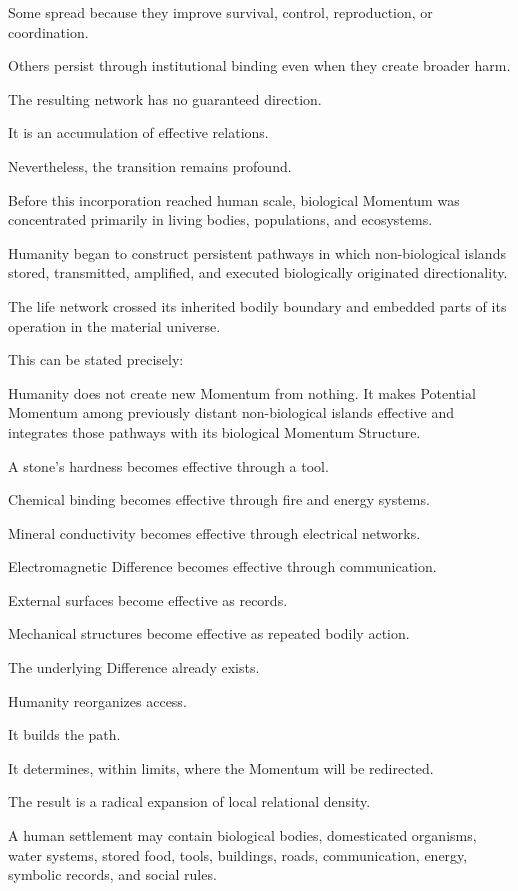 Some spread because they improve survival, control, reproduction, or coordination.

Others persist through institutional binding even when they create broader harm.

The resulting network has no guaranteed direction.

It is an accumulation of effective relations.

Nevertheless, the transition remains profound.

Before this incorporation reached human scale, biological Momentum was concentrated primarily in living bodies, populations, and ecosystems.

Humanity began to construct persistent pathways in which non-biological islands stored, transmitted, amplified, and executed biologically originated directionality.

The life network crossed its inherited bodily boundary and embedded parts of its operation in the material universe.

This can be stated precisely:

Humanity does not create new Momentum from nothing. It makes Potential Momentum among previously distant non-biological islands effective and integrates those pathways with its biological Momentum Structure.

A stone’s hardness becomes effective through a tool.

Chemical binding becomes effective through fire and energy systems.

Mineral conductivity becomes effective through electrical networks.

Electromagnetic Difference becomes effective through communication.

External surfaces become effective as records.

Mechanical structures become effective as repeated bodily action.

The underlying Difference already exists.

Humanity reorganizes access.

It builds the path.

It determines, within limits, where the Momentum will be redirected.

The result is a radical expansion of local relational density.

A human settlement may contain biological bodies, domesticated organisms, water systems, stored food, tools, buildings, roads, communication, energy, symbolic records, and social rules.

